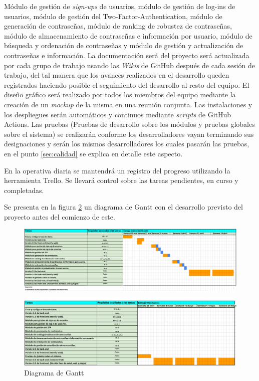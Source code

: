 \documentclass{article}
\begin{document}
Módulo de gestión de \textit{sign-ups} de usuarios, módulo de gestión de log-ins de usuarios, módulo de gestión del Two-Factor-Authentication, módulo de generación de contraseñas, módulo de ranking de robustez de contraseñas, módulo de almacenamiento de contraseñas e información por usuario, módulo de búsqueda y ordenación de contraseñas y módulo de gestión y actualización de contraseñas e información. La documentación será del proyecto será actualizada por cada grupo de trabajo usando las \textit{Wikis} de GitHub después de cada sesión de trabajo, del tal manera que los avances realizados en el desarrollo queden registrados haciendo posible el seguimiento del desarrollo al resto del equipo. El diseño gráfico será realizado por todos los miembros del equipo mediante la creación de un \textit{mockup} de la misma en una reunión conjunta. Las instalaciones y los despliegues serán automáticos y continuos mediante \textit{scripts} de GitHub Actions. Las pruebas (Pruebas de desarrollo sobre los módulos y pruebas globales sobre el sistema) se realizarán conforme los desarrolladores vayan terminando sus designaciones y serán los mismos desarrolladores los cuales pasarán las pruebas, en el punto \ref{sec:calidad} se explica en detalle este aspecto. 

En la operativa diaria se mantendrá un registro del progreso utilizando la herramienta Trello. Se llevará control sobre las tareas pendientes, en curso y completadas.

Se presenta en la figura \ref{gantt-2} un diagrama de Gantt con el desarrollo previsto del proyecto antes del comienzo de este.

\begin{landscape}
    \begin{figure}[H]
        \centering
        \includegraphics[width=1.4\textheight]{../images/diag-gantt-1.png}
        \label{gantt-1}
    \end{figure}
    
    \begin{figure}[H]
        \centering
        \includegraphics[width=1.4\textheight]{../images/diag-gantt-2.png}
        \caption{Diagrama de Gantt}
        \label{gantt-2}
    \end{figure}
\end{landscape}
    
\end{document}
